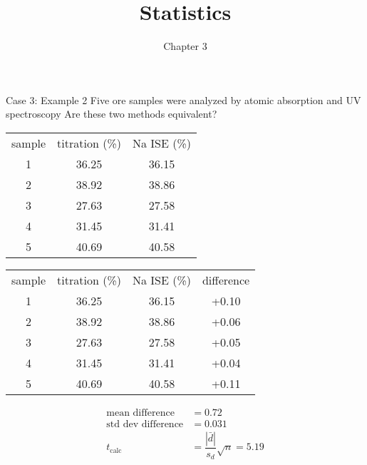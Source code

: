 \documentclass{beamer}
\title{Statistics}
\subtitle{Chapter 3}
\institute{CHEM321 - Analytical Chemistry I}
\begin{document}
\begin{frame}[allowframebreaks]{Case 3: Example 2}
	Five ore samples were analyzed by atomic absorption and UV spectroscopy
	Are these two methods equivalent?

	\begin{center}
		\begin{tabu} to \textwidth {c S S}
			{sample} & {titration (\%)} & {Na ISE (\%)} \\
			\tabucline[1.5pt]{-}
			1 & 36.25 & 36.15 \\
			2 & 38.92 & 38.86 \\
			3 & 27.63 & 27.58 \\
			4 & 31.45 & 31.41 \\
			5 & 40.69 & 40.58 \\
		\end{tabu}
	\end{center}

	\framebreak

	\begin{center}
		\begin{tabu} to \textwidth {c S S S[table-format=+1.2]}
			{sample} & {titration (\%)} & {Na ISE (\%)} &
			{difference} \\ \tabucline[1.5pt]{-}
			1 & 36.25 & 36.15 & +0.10 \\
			2 & 38.92 & 38.86 & +0.06 \\
			3 & 27.63 & 27.58 & +0.05 \\
			4 & 31.45 & 31.41 & +0.04 \\
			5 & 40.69 & 40.58 & +0.11 \\
		\end{tabu}
	\end{center}

	\begin{align*}
		\text{mean difference} &= 0.72 \\
		\text{std dev difference} &= 0.031 \\
		t_{\text{calc}} &= \dfrac{|\bar{d}|}{s_d} \sqrt{n} = 5.19
	\end{align*}

\end{frame}
\end{document}
